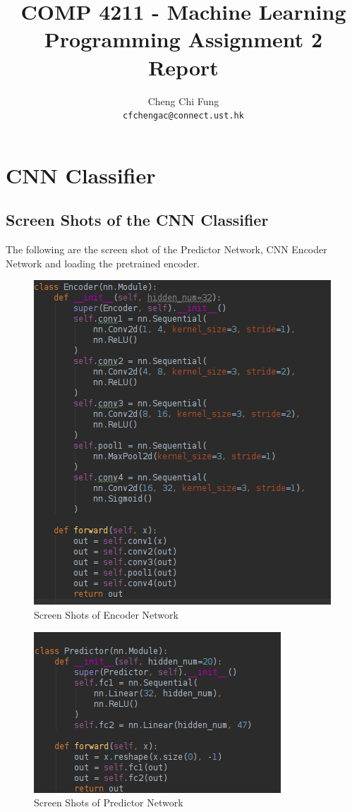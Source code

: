 \documentclass{article}
\title{COMP 4211 - Machine Learning Programming Assignment 2 Report}
\author{%
	Cheng Chi Fung \\
	\texttt{cfchengac@connect.ust.hk} \\
}
\begin{document}
\maketitle

\section{CNN Classifier}

\subsection{Screen Shots of the CNN Classifier}
The following are the screen shot of the Predictor Network, CNN Encoder Network and loading the pretrained encoder.

\begin{figure}[h]
  \centering
  \includegraphics[scale=1]{encoder.png}
  \caption{Screen Shots of Encoder Network}
\end{figure}

\pagebreak

\begin{figure}[h]
  \centering
  \includegraphics[scale=1]{predictor.png}
  \caption{Screen Shots of Predictor Network}
\end{figure}
\end{document}
